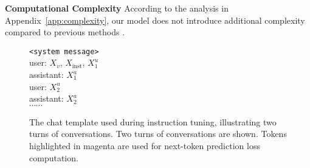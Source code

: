 \noindent\textbf{Computational Complexity} According to the analysis in Appendix~\ref{app:complexity}, our model does not introduce additional complexity compared to previous methods \cite{scotti2024mindeye2, wang2024mindbridge}.


\begin{figure}[htbp]
\vspace{-0.8em}
\centering
\begin{minipage}{0.99\columnwidth}\vspace{0mm}    \centering
\begin{tcolorbox}[colback=white,colframe=gray,left=1pt,top=1pt,bottom=1pt]
\sffamily
\footnotesize	
  \texttt{<system message>}\\
  user: $X_v$, $X_\text{inst}$, $X_1^u$ \\
  assistant: {\color{magenta}$X_1^a$}\\
user: $X_2^u$\\
  assistant: {\color{magenta}$X_2^a$}\\
  $\cdots\cdots$
\end{tcolorbox}
\end{minipage}
\caption{The chat template used during instruction tuning, illustrating two turns of conversations. Two turns of conversations are shown. Tokens highlighted in {\color{magenta}magenta} are used for next-token prediction loss computation.}
\label{fig:chat}
\vspace{-1.2em}
\end{figure}

